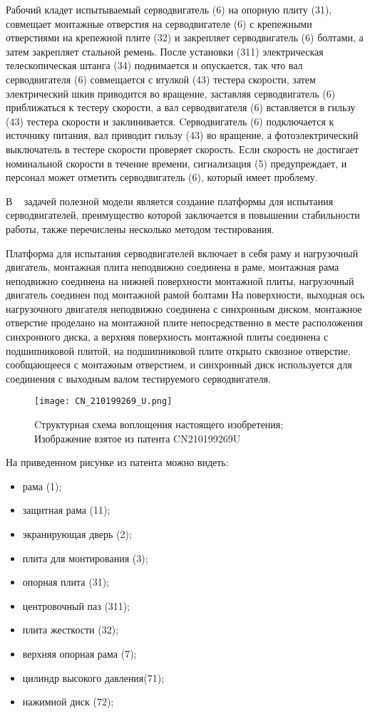 Рабочий кладет испытываемый серводвигатель (6) на опорную плиту (31),
совмещает монтажные отверстия на серводвигателе (6) с крепежными
отверстиями на крепежной плите (32) и закрепляет серводвигатель (6)
болтами, а затем закрепляет стальной ремень.  После установки (311)
электрическая телескопическая штанга (34) поднимается и опускается,
так что вал серводвигателя (6) совмещается с втулкой (43) тестера
скорости, затем электрический шкив приводится во вращение, заставляя
серводвигатель (6) приближаться к тестеру скорости, а вал
серводвигателя (6) вставляется в гильзу (43) тестера скорости и
заклинивается. Cерводвигатель (6) подключается к источнику питания,
вал приводит гильзу (43) во вращение, а фотоэлектрический выключатель
в тестере скорости проверяет скорость. Если скорость не достигает
номинальной скорости в течение времени, сигнализация (5)
предупреждает, и персонал может отметить серводвигатель (6), который
имеет проблему.


В ~\cite{CN210199269U} задачей полезной модели является создание
платформы для испытания серводвигателей, преимущество которой
заключается в повышении стабильности работы,
также перечислены несколько методом тестирования.

Платформа для испытания серводвигателей включает в себя раму и
нагрузочный двигатель, монтажная плита неподвижно соединена в раме,
монтажная рама неподвижно соединена на нижней поверхности монтажной
плиты, нагрузочный двигатель соединен под монтажной рамой болтами На
поверхности, выходная ось нагрузочного двигателя неподвижно соединена
с синхронным диском, монтажное отверстие проделано на монтажной плите
непосредственно в месте расположения синхронного диска, а верхняя
поверхность монтажной плиты соединена с подшипниковой плитой, на
подшипниковой плите открыто сквозное отверстие, сообщающееся с
монтажным отверстием, и синхронный диск используется для соединения с
выходным валом тестируемого серводвигателя.


\begin{figure}[H]
  \centering
  \texttt{[image: CN\_210199269\_U.png]}
  \caption{Cтруктурная схема воплощения настоящего изобретения;
    Изображение взятое из патента CN210199269U}
\end{figure}

На приведенном рисунке из патента можно видеть:
\begin{itemize}
\item рама (1);
\item защитная рама (11);
\item экранирующая дверь (2);  
\item плита для монтирования (3);
\item опорная плита (31);
\item центровочный паз (311);  
\item плита жесткости (32);
\item верхняя опорная рама (7);
\item цилиндр высокого давления(71);
\item нажимной диск (72);
\end{itemize}


